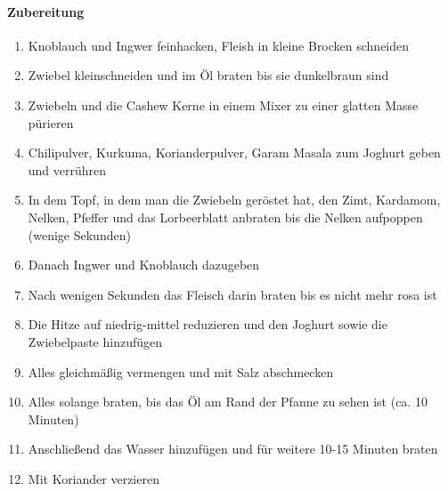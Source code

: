 \paragraph{Zubereitung}
\begin{enumerate}[noitemsep]
	\item Knoblauch und Ingwer feinhacken, Fleish in kleine Brocken schneiden
	\item Zwiebel kleinschneiden und im Öl braten bis sie dunkelbraun sind
	\item Zwiebeln und die Cashew Kerne in einem Mixer zu einer glatten Masse pürieren 
	\item Chilipulver, Kurkuma, Korianderpulver, Garam Masala zum Joghurt geben und verrühren
	\item In dem Topf, in dem man die Zwiebeln geröstet hat, den Zimt, Kardamom, Nelken, Pfeffer und das Lorbeerblatt anbraten bis die Nelken aufpoppen (wenige Sekunden)
	\item Danach Ingwer und Knoblauch dazugeben 
	\item Nach wenigen Sekunden das Fleisch darin braten bis es nicht mehr rosa ist
	\item Die Hitze auf niedrig-mittel reduzieren und den Joghurt sowie die Zwiebelpaste hinzufügen
	\item Alles gleichmäßig vermengen und mit Salz abschmecken
	\item Alles solange braten, bis das Öl am Rand der Pfanne zu sehen ist (ca. 10 Minuten)
	\item Anschließend das Wasser hinzufügen und für weitere 10-15 Minuten braten
	\item Mit Koriander verzieren
\end{enumerate}

